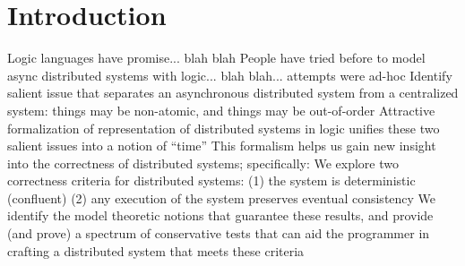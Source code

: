 \section{Introduction}
Logic languages have promise... blah blah
People have tried before to model async distributed systems with logic... blah blah... attempts were ad-hoc
Identify salient issue that separates an asynchronous distributed system from a centralized system: things may be non-atomic, and things may be out-of-order
Attractive formalization of representation of distributed systems in logic unifies these two salient issues into a notion of ``time''
This formalism helps us gain new insight into the correctness of distributed systems; specifically:
We explore two correctness criteria for distributed systems:
(1) the system is deterministic (confluent)
(2) any execution of the system preserves eventual consistency
We identify the model theoretic notions that guarantee these results, and provide (and prove) a spectrum of conservative tests that can aid the programmer in crafting a distributed system that meets these criteria

